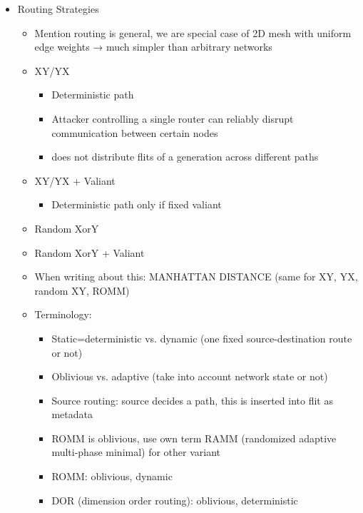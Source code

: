 \begin{itemize}
    \item Routing Strategies
        \begin{itemize}
            \item Mention routing is general, we are special case of 2D mesh with uniform edge weights → much simpler than arbitrary networks
            \item XY/YX
                \begin{itemize}
                    \item Deterministic path
                    \item Attacker controlling a single router can reliably disrupt communication between certain nodes
                    \item does not distribute flits of a generation across different paths
                \end{itemize}
            \item XY/YX + Valiant
                \begin{itemize}
                    \item Deterministic path only if fixed valiant
                \end{itemize}
            \item Random XorY
            \item Random XorY + Valiant
            \item When writing about this: MANHATTAN DISTANCE (same for XY, YX, random XY, ROMM)
            \item Terminology:
                \begin{itemize}
                    \item Static=deterministic vs. dynamic (one fixed source-destination route or not)
                    \item Oblivious vs. adaptive (take into account network state or not)
                    \item Source routing: source decides a path, this is inserted into flit as metadata
                    \item ROMM is oblivious, use own term RAMM (randomized adaptive multi-phase minimal) for other variant
                    \item ROMM: oblivious, dynamic
                    \item DOR (dimension order routing): oblivious, deterministic
        \end{itemize}
\end{itemize}


\end{itemize}
